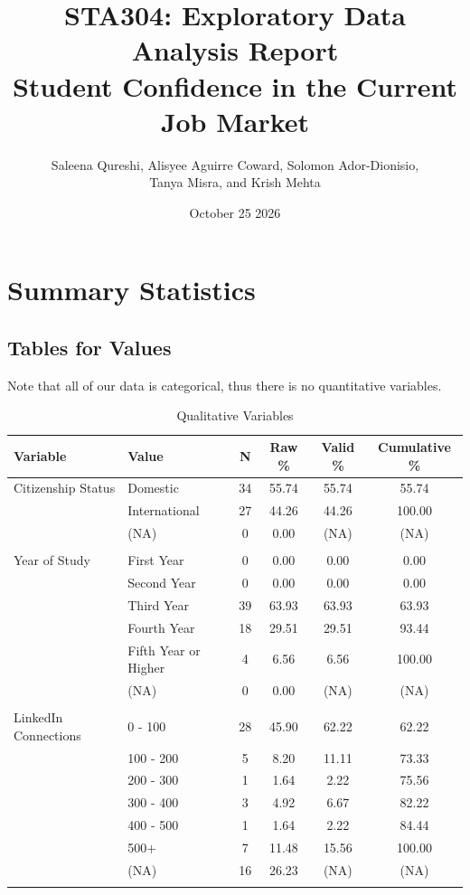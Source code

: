 \documentclass{article}
\title{STA304: Exploratory Data Analysis Report\\
\large Student Confidence in the Current Job Market}
\author{Saleena Qureshi, Alisyee Aguirre Coward, Solomon Ador-Dionisio,\\ 
Tanya Misra, and Krish Mehta}
\date{October 25 2026}
\begin{document}
\maketitle
\section{Summary Statistics}
\subsection{Tables for Values}
Note that all of our data is categorical, thus there is no quantitative variables.
\begingroup
    \small
    \setlength{\tabcolsep}{4pt}
    \begin{longtable}{llcccc}
    \caption{Qualitative Variables}\label{tab:qualit_table}\\
    \hline
    Variable & Value & N & Raw \% & Valid \% & Cumulative \% \\ \hline
    \endfirsthead

        Citizenship Status & Domestic & 34 & 55.74 & 55.74 & 55.74\\
       & International &  27 & 44.26 & 44.26 & 100.00\\
       & (NA) & 0 & 0.00 & (NA) & (NA)\\ \\

       Year of Study & First Year & 0 & 0.00 & 0.00 & 0.00\\
       & Second Year & 0 & 0.00 & 0.00 & 0.00\\
       & Third Year & 39 & 63.93 & 63.93 & 63.93\\
       & Fourth Year & 18 & 29.51 & 29.51 & 93.44\\
       & Fifth Year or Higher & 4 & 6.56 & 6.56 & 100.00\\
       & (NA) & 0 & 0.00 & (NA) & (NA)\\\\

       LinkedIn Connections & 0 - 100 & 28 & 45.90 & 62.22 & 62.22\\
       & 100 - 200 & 5 & 8.20 & 11.11 & 73.33\\
       & 200 - 300 & 1 & 1.64 & 2.22 & 75.56\\
       & 300 - 400 & 3 & 4.92 & 6.67 & 82.22\\
       & 400 - 500 & 1 & 1.64 & 2.22 & 84.44\\
       & 500+ & 7 & 11.48 & 15.56 & 100.00\\
       & (NA) & 16 & 26.23 & (NA) & (NA)\\ \\
        

\end{longtable}
\end{document}
